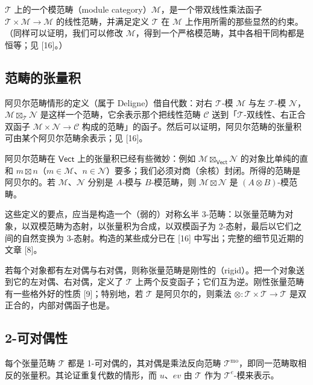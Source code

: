 $\mathcal{T}$ 上的一个模范畴（module category）$\mathcal{M}$，是一个带双线性乘法函子 $\mathcal{T}\times\mathcal{M}\to\mathcal{M}$ 的线性范畴，并满足定义 $\mathcal{T}$ 在 $\mathcal{M}$ 上作用所需的那些显然的约束。（同样可以证明，我们可以修改 $\mathcal{M}$，得到一个严格模范畴，其中各相干同构都是恒等；见 [16]。）

\subsection{范畴的张量积}

阿贝尔范畴情形的定义（属于 Deligne）借自代数：对右 $\mathcal{T}$-模 $\mathcal{M}$ 与左 $\mathcal{T}$-模 $\mathcal{N}$，$\mathcal{M}\boxtimes_{\mathcal{T}}\mathcal{N}$ 是这样一个范畴，它余表示那个把线性范畴 $\mathcal{C}$ 送到「$\mathcal{T}$-双线性、右正合双函子 $\mathcal{M}\times\mathcal{N}\to\mathcal{C}$ 构成的范畴」的函子。然后可以证明，阿贝尔范畴的张量积可由某个阿贝尔范畴余表示；见 [16]。

\begin{remark}
阿贝尔范畴在 $\mathsf{Vect}$ 上的张量积已经有些微妙：例如 $\mathcal{M}\boxtimes_{\mathsf{Vect}}\mathcal{N}$ 的对象比单纯的直和 $m\boxtimes n$（$m\in\mathcal{M}$、$n\in\mathcal{N}$）要多；我们必须对商（余核）封闭。所得的范畴是阿贝尔的。若 $\mathcal{M}$、$\mathcal{N}$ 分别是 $A$-模与 $B$-模范畴，则 $\mathcal{M}\boxtimes\mathcal{N}$ 是 $(A\otimes B)$-模范畴。
\end{remark}

这些定义的要点，应当是构造一个（弱的）对称幺半 3-范畴：以张量范畴为对象，以双模范畴为态射，以张量积为合成，以双模函子为 2-态射，最后以它们之间的自然变换为 3-态射。构造的某些成分已在 [16] 中写出；完整的细节见近期的文章 [8]。

\begin{definition}
若每个对象都有左对偶与右对偶，则称张量范畴是刚性的（rigid）。把一个对象送到它的左对偶、右对偶，定义了 $\mathcal{T}$ 上两个反变函子；它们互为逆。刚性张量范畴有一些格外好的性质 [9]；特别地，若 $\mathcal{T}$ 是阿贝尔的，则乘法 $\otimes\colon\mathcal{T}\times\mathcal{T}\to\mathcal{T}$ 是双正合的，内部对偶函子也是。
\end{definition}

\subsection{2-可对偶性}

每个张量范畴 $\mathcal{T}$ 都是 1-可对偶的，其对偶是乘法反向范畴 $\mathcal{T}^{\mathrm{mo}}$，即同一范畴取相反的张量积。其论证重复代数的情形，而 $u$、$ev$ 由 $\mathcal{T}$ 作为 $\mathcal{T}^e$-模来表示。

